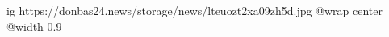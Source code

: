  
 
 
 
 

\ifcmt
  ig https://donbas24.news/storage/news/lteuozt2xa09zh5d.jpg
  @wrap center
  @width 0.9
\fi

